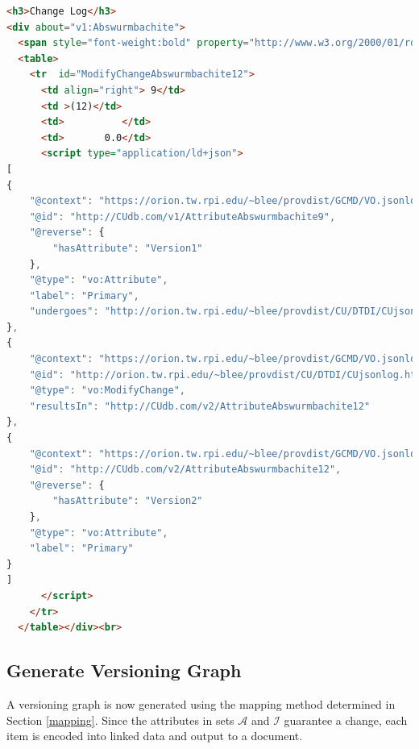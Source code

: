 \begin{lstlisting}[language=HTML, caption=Abswurmbachite JSON-LD, label=json_list]
<h3>Change Log</h3>
<div about="v1:Abswurmbachite">
  <span style="font-weight:bold" property="http://www.w3.org/2000/01/rdf-schema#label">Abswurmbachite</span>
  <table>
    <tr  id="ModifyChangeAbswurmbachite12">
      <td align="right"> 9</td>
      <td >(12)</td>
      <td>          </td>
      <td>       0.0</td>
      <script type="application/ld+json">
[
{
	"@context": "https://orion.tw.rpi.edu/~blee/provdist/GCMD/VO.jsonld", 
	"@id": "http://CUdb.com/v1/AttributeAbswurmbachite9", 
	"@reverse": {
		"hasAttribute": "Version1"
	}, 
	"@type": "vo:Attribute", 
	"label": "Primary", 
	"undergoes": "http://orion.tw.rpi.edu/~blee/provdist/CU/DTDI/CUjsonlog.html#ModifyChangeAbswurmbachite12"
}, 
{
	"@context": "https://orion.tw.rpi.edu/~blee/provdist/GCMD/VO.jsonld", 
	"@id": "http://orion.tw.rpi.edu/~blee/provdist/CU/DTDI/CUjsonlog.html#ModifyChangeAbswurmbachite12", 
	"@type": "vo:ModifyChange", 
	"resultsIn": "http://CUdb.com/v2/AttributeAbswurmbachite12"
}, 
{
	"@context": "https://orion.tw.rpi.edu/~blee/provdist/GCMD/VO.jsonld", 
	"@id": "http://CUdb.com/v2/AttributeAbswurmbachite12", 
	"@reverse": {
		"hasAttribute": "Version2"
	}, 
	"@type": "vo:Attribute", 
	"label": "Primary"
}
]
      </script>
    </tr>
  </table></div><br>
\end{lstlisting}

\subsection{Generate Versioning Graph}

A versioning graph is now generated using the mapping method determined in Section \ref{mapping}.
Since the attributes in sets \(\mathcal{A}\) and \(\mathcal{I}\) guarantee a change, each item is encoded into linked data and output to a document.


